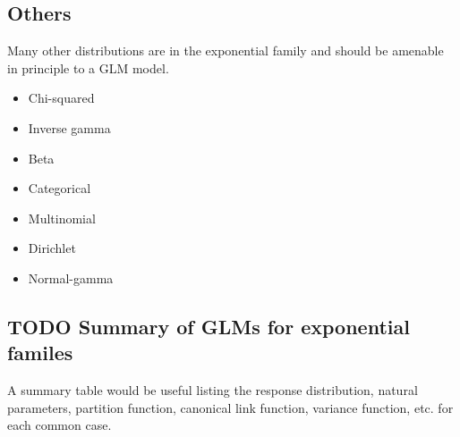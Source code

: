 \documentclass{article}
\begin{document}
\subsection{Others}
Many other distributions are in the exponential family and should be amenable in
principle to a GLM model.
\begin{itemize}
\item Chi-squared
\item Inverse gamma
\item Beta
\item Categorical
\item Multinomial
\item Dirichlet
\item Normal-gamma
\end{itemize}

\subsection{TODO Summary of GLMs for exponential familes}

A summary table would be useful listing the response distribution, natural
parameters, partition function, canonical link function, variance function, etc.
for each common case.
\end{document}
